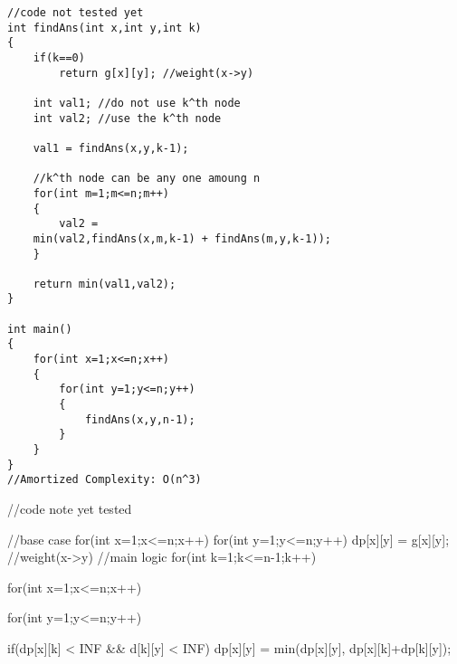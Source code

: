 \begin{fullwidth}
    
\begin{minipage}{0.5\fullfigurelen}
\begin{lstlisting}[style=scode,caption=Recursive Code]
//code not tested yet
int findAns(int x,int y,int k)
{
    if(k==0)
        return g[x][y]; //weight(x->y)

    int val1; //do not use k^th node
    int val2; //use the k^th node

    val1 = findAns(x,y,k-1);

    //k^th node can be any one amoung n
    for(int m=1;m<=n;m++) 
    {
        val2 = 
    min(val2,findAns(x,m,k-1) + findAns(m,y,k-1));
    }

    return min(val1,val2);
}

int main()
{
    for(int x=1;x<=n;x++)
    {
        for(int y=1;y<=n;y++)
        {
            findAns(x,y,n-1);
        }
    }
}
//Amortized Complexity: O(n^3)
\end{lstlisting}
\end{minipage}
\begin{minipage}{0.5\fullfigurelen}
\begin{code3}
    //code note yet tested

    //base case
    for(int x=1;x<=n;x++)
    {
        for(int y=1;y<=n;y++)
        {
            dp[x][y] = g[x][y]; //weight(x->y)
        }
    }
    //main logic
    for(int k=1;k<=n-1;k++)
    {
        for(int x=1;x<=n;x++)
        {
            for(int y=1;y<=n;y++)
            {

        if(dp[x][k] < INF && d[k][y] < INF)
        dp[x][y] = min(dp[x][y],
                    dp[x][k]+dp[k][y]);

            }
        }
    }
\end{code3}
\end{minipage}
\end{fullwidth}
